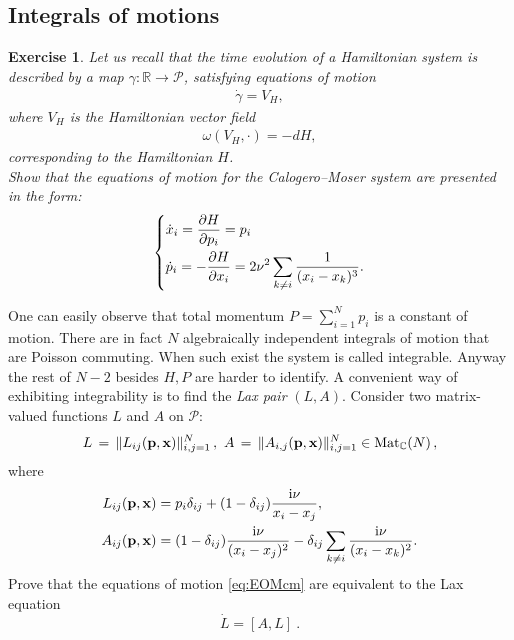 \documentclass[12pt]{article}
\newtheorem{exer}{Exercise}[section]
\newcommand{\problemname}{}
\newenvironment{statement}[1]
 {\renewcommand{\problemname}{#1}\problem}
 {\endproblem}
\numberwithin{equation}{section}
\newcommand\beq{\begin{equation}}
\newcommand\eeq{\end{equation}}
\theoremstyle{definition}
\newcommand {\CalP} {\mathcal P}
\newcommand {\ii} {\mathrm{i}}
\begin{document}
\subsection{Integrals of motions}
\begin{exer}\normalfont
 Let us recall that the time evolution of a Hamiltonian system is described by a map $\gamma: \mathbb{R} \rightarrow \mathcal{P}$, satisfying equations of motion
 \begin{align*}
     \dot \gamma = V_{H},
 \end{align*}
where $V_{H}$ is the Hamiltonian vector field
\begin{align*}
    \omega(V_{H}, \cdot) = -dH,
\end{align*}
corresponding to the Hamiltonian $H$.\\
Show that the equations of motion for the Calogero--Moser system are presented in the form:
 \beq
     \begin{dcases}
         \dot x_{i} = \frac{\partial H}{\partial p_i} = p_i\\
         \dot p_i = - \frac{\partial H}{\partial x_i} = 2 \nu^2 \sum\limits_{k \neq i} \frac{1}{(x_i - x_k)^3}.
     \end{dcases}
     \label{eq:EOMcm}
 \eeq
 \end{exer}
 One can easily observe that total momentum $P = \sum \limits_{i = 1}^{N} p_i$  is a constant of motion. There are in fact $N$ algebraically independent integrals of motion that are Poisson commuting. When such exist the system is called integrable. Anyway the rest of $N - 2$ besides $H, P$ are harder to identify. A convenient way of exhibiting integrability is to find the \textit{Lax pair} $(L, A)$.
\begin{statement}{Problem 1}\normalfont\label{prob1}
    Consider two matrix-valued functions $L$ and $A$ on $\CalP$:
    \beq 
    L \, =\,  \Vert L_{ij} ({\bf p},{\bf x}) \Vert_{i, j = 1}^{N}\, , \ A \, = \, \Vert A_{i, j} ({\bf p},{\bf x}) \Vert_{i, j = 1}^{N} \in \mathrm{Mat}_{\mathbb{C}}(N)\, , 
    \eeq
    where 
 \begin{align}
     L_{ij} ({\bf p},{\bf x})  &= p_i \delta_{ij} + (1 - \delta_{ij})\frac{{\ii} \nu}{x_i - x_j}, \\
     A_{ij} ({\bf p},{\bf x})  &= (1 - \delta_{ij})\frac{{\ii} \nu }{(x_i - x_j)^2} - \delta_{ij}  \sum\limits_{k \neq i} \frac{{\ii} \nu}{(x_i - x_k)^2}. \label{Amat}
 \end{align}
Prove that the equations of motion \eqref{eq:EOMcm} are equivalent to the Lax equation 
\beq
\dot L = [A, L]\ .
\label{eq:laxeq}
\eeq
 \end{statement}
\end{document}
